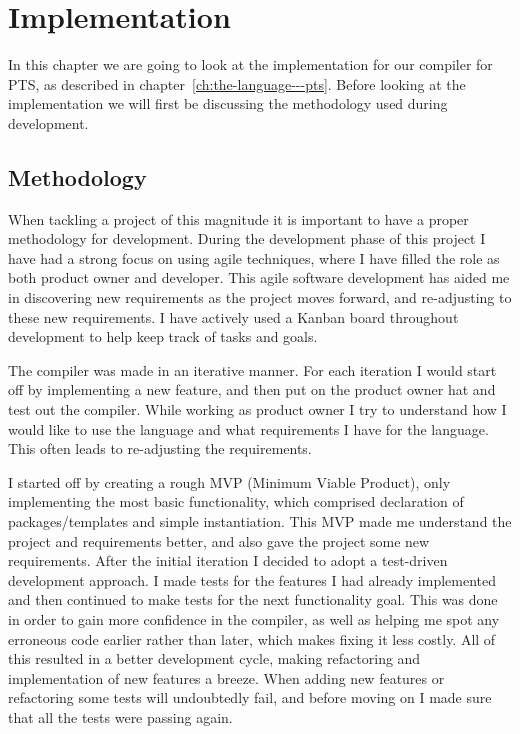 
\chapter{Implementation}\label{ch:implementation}

In this chapter we are going to look at the implementation for our compiler for PTS, as described in chapter~\vref{ch:the-language---pts}.
Before looking at the implementation we will first be discussing the methodology used during development.

\section{Methodology}\label{sec:methodology}

When tackling a project of this magnitude it is important to have a proper methodology for development.
During the development phase of this project I have had a strong focus on using agile techniques, where I have filled the role as both product owner and developer.
This agile software development has aided me in discovering new requirements as the project moves forward, and re-adjusting to these new requirements.
I have actively used a Kanban board throughout development to help keep track of tasks and goals.

The compiler was made in an iterative manner.
For each iteration I would start off by implementing a new feature, and then put on the product owner hat and test out the compiler.
While working as product owner I try to understand how I would like to use the language and what requirements I have for the language.
This often leads to re-adjusting the requirements.

I started off by creating a rough MVP (Minimum Viable Product), only implementing the most basic functionality, which comprised declaration of packages/templates and simple instantiation.
This MVP made me understand the project and requirements better, and also gave the project some new requirements.
After the initial iteration I decided to adopt a test-driven development approach.
I made tests for the features I had already implemented and then continued to make tests for the next functionality goal.
This was done in order to gain more confidence in the compiler, as well as helping me spot any erroneous code earlier rather than later, which makes fixing it less costly.
All of this resulted in a better development cycle, making refactoring and implementation of new features a breeze.
When adding new features or refactoring some tests will undoubtedly fail, and before moving on I made sure that all the tests were passing again.


